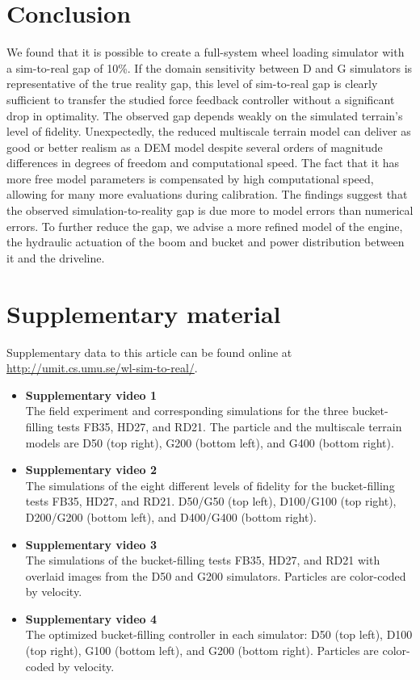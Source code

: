 \documentclass[10pt]{article}
\begin{document}
\section{Conclusion}
\label{sec:conclusion}

We found that it is possible to create a full-system wheel loading simulator with a sim-to-real
gap of 10\%. If the domain sensitivity between D and G simulators is representative
of the true reality gap, this level of sim-to-real gap is clearly sufficient to transfer the studied force feedback controller without a significant drop in optimality. 
The observed gap depends weakly on the simulated terrain's level of fidelity.
Unexpectedly, the reduced multiscale terrain model can deliver as good or better realism as a DEM model
despite several orders of magnitude differences in degrees of freedom and computational speed.
The fact that it has more free model parameters is compensated by high computational speed,
allowing for many more evaluations during calibration. The findings suggest that the 
observed simulation-to-reality gap is due more to model errors than numerical errors. 
To further reduce the gap, we advise a more refined model of the engine, the hydraulic actuation
of the boom and bucket and power distribution between it and the driveline. 


\section*{Supplementary material}
\label{sec:supplementary}
Supplementary data to this article can be found online at \url{http://umit.cs.umu.se/wl-sim-to-real/}.
\begin{itemize}
    \item [] \textbf{Supplementary video 1} \\
    The field experiment and corresponding simulations for the three bucket-filling tests FB35, HD27, and RD21.
    The particle and the multiscale terrain models are D50 (top right), G200 (bottom left), and G400 (bottom right).
    \item [] \textbf{Supplementary video 2} \\
    The simulations of the eight different levels of fidelity for the bucket-filling tests FB35, HD27, and RD21.
    D50/G50 (top left), D100/G100 (top right), D200/G200 (bottom left), and D400/G400 (bottom right).
    \item [] \textbf{Supplementary video 3} \\
    The simulations of the bucket-filling tests FB35, HD27, and RD21 with overlaid images from the D50 and G200 simulators.
    Particles are color-coded by velocity.
    \item [] \textbf{Supplementary video 4} \\
    The optimized bucket-filling controller in each simulator: D50 (top left), D100 (top right), G100 (bottom left), and G200 (bottom right).
    Particles are color-coded by velocity.
\end{itemize}
\end{document}
